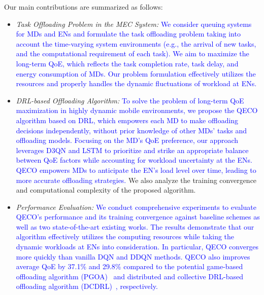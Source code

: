 \documentclass[12pt,draftclsnofoot,onecolumn]{IEEEtran}
\begin{document}
Our main contributions are summarized as follows:

\begin{itemize}
	\item \textit{Task Offloading Problem in the MEC System:} \textcolor{blue}{ We consider queuing systems for MDs and ENs and formulate the task offloading problem taking into account the time-varying system environments (e.g., the arrival of new tasks, and the computational requirement of each task). We aim to maximize the long-term QoE, which reflects the task completion rate, task delay, and energy consumption of MDs. Our problem formulation effectively utilizes the resources and properly handles the dynamic fluctuations of workload at ENs. }
	
	
	
	\item \textit{DRL-based Offloading Algorithm:} \textcolor{blue}{To solve the problem of long-term QoE maximization in highly dynamic mobile environments, we propose the QECO algorithm based on DRL, which empowers each MD to make offloading decisions independently, without prior knowledge of other MDs' tasks and offloading models. Focusing on the MD's QoE preference, our approach leverages D3QN and LSTM to prioritize and strike an appropriate balance between QoE factors while accounting for workload uncertainty at the ENs. QECO empowers MDs to anticipate the EN's load level over time, leading to more accurate offloading strategies.} We also analyze the training convergence and computational complexity of the proposed algorithm.
	
	\item \textit{Performance Evaluation:} \textcolor{blue}{We conduct comprehensive experiments to evaluate QECO’s performance and its training convergence against baseline schemes as well as two state-of-the-art existing works. The results demonstrate that our algorithm effectively utilizes the computing resources while taking the dynamic workloads at ENs into consideration. In particular, QECO converges more quickly than vanilla DQN and DDQN methods. QECO also improves average QoE by 37.1\% and 29.8\% compared to the potential game-based offloading algorithm (PGOA)~\cite{yang2018distributed} and distributed and collective DRL-based offloading algorithm (DCDRL)~\cite{qiu2020distributed}, respectively.}
	

\end{itemize}
\end{document}
